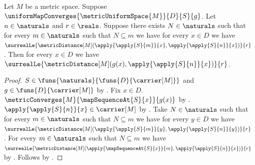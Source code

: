 \begin{theorem}\label{uniform_map_limit_closed_tail_bound}
    Let $M$ be a metric space.
    Suppose $\uniformMapConverges
        {\metricUniformSpace{M}}{D}{S}{g}$.
    Let $n\in\naturals$ and $r\in\reals$.
    Suppose there exists $N\in\naturals$ such that for every
        $m\in\naturals$ such that $N\subseteq m$ we have
        for every $x\in D$ we have
        $\surrealLe{\metricDistance[M]
            (\apply{\apply{S}{m}}{x},
             \apply{\apply{S}{n}}{x})}{r}$.
    Then for every $x\in D$ we have
        $\surrealLe{\metricDistance[M]
            (g(x),\apply{\apply{S}{n}}{x})}{r}$.
\end{theorem}
\begin{proof}
    $S\in\funs{\naturals}{\funs{D}{\carrier[M]}}$ and
        $g\in\funs{D}{\carrier[M]}$
        by
        .
    Fix $x\in D$.
    $\metricConverges{M}{\mapSequenceAt{S}{x}}{g(x)}$
        by .
    $\apply{\apply{S}{n}}{x}\in\carrier[M]$
        by .
    Take $N\in\naturals$ such that for every $m\in\naturals$
        such that $N\subseteq m$ we have for every $y\in D$ we have
        $\surrealLe{\metricDistance[M]
            (\apply{\apply{S}{m}}{y},
             \apply{\apply{S}{n}}{y})}{r}$.
    For every $m\in\naturals$ such that $N\subseteq m$ we have
        $\surrealLe{\metricDistance[M]
            (\apply{\mapSequenceAt{S}{x}}{m},
             \apply{\apply{S}{n}}{x})}{r}$
        by .
    Follows by .
\end{proof}

